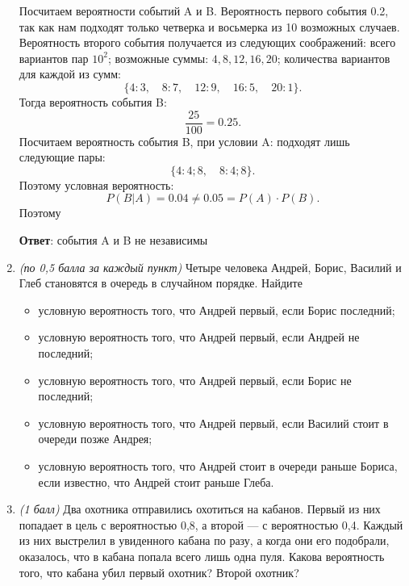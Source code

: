 \documentclass{article}
\begin{document}
\begin{enumerate}
    Посчитаем вероятности событий A и B. Вероятность первого события 0.2, так как нам подходят только четверка и восьмерка из 10 возможных случаев. Вероятность второго события получается из следующих соображений: всего вариантов пар $10^2$; возможные суммы: $4,8,12,16,20$; количества вариантов для каждой из сумм:
    \begin{equation}
        \{4:3,\quad8:7,\quad12:9,\quad16:5,\quad20:1\}.
    \end{equation}
    Тогда вероятность события B:
    \begin{equation}
        \frac{25}{100} = 0.25.
    \end{equation}
    Посчитаем вероятность события B, при условии A: подходят лишь следующие пары:
    \begin{equation}
        \{4:4;8,\quad 8:4;8\}.
    \end{equation}
    Поэтому условная вероятность:
    \begin{equation}
        P(B|A) = 0.04 \ne 0.05 = P(A)\cdot P(B).
    \end{equation}
    Поэтому

    \textbf{Ответ}:
    события A и B не независимы

    \item \textit{(по 0,5 балла за каждый пункт)} Четыре человека Андрей, Борис, Василий и Глеб
    становятся в очередь в случайном порядке. Найдите
    \begin{itemize}
        \item условную вероятность того, что Андрей первый, если Борис последний;
        \item условную вероятность того, что Андрей первый, если Андрей не последний;
        \item условную вероятность того, что Андрей первый, если Борис не последний;
        \item условную вероятность того, что Андрей первый, если Василий стоит в очереди
        позже Андрея;
        \item условную вероятность того, что Андрей стоит в очереди раньше Бориса, если
        известно, что Андрей стоит раньше Глеба.
    \end{itemize}
    \item \textit{(1 балл)} Два охотника отправились охотиться на кабанов. Первый из них попадает в
    цель с вероятностью 0,8, а второй — с вероятностью 0,4. Каждый из них выстрелил
    в увиденного кабана по разу, а когда они его подобрали, оказалось, что в кабана
    попала всего лишь одна пуля. Какова вероятность того, что кабана убил первый
    охотник? Второй охотник?
  \end{enumerate}
\end{document}
